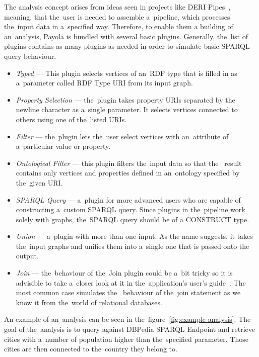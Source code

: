 The analysis concept arises from ideas seen in projects like DERI 
Pipes~\cite{deri-pipes}, meaning, that the~user is needed to assemble a~pipeline,
which processes the~input data in a~specified way. Therefore, to enable them a 
building of an~analysis, Payola is bundled with several basic 
plugins. Generally, the~list of plugins contains as many plugins as needed
in order to simulate basic SPARQL query behaviour.

\begin{itemize}
  \item \emph{Typed} --- This plugin selects vertices of an~RDF type that is filled in
  as a~parameter called RDF Type URI from its input graph.
  
  \item \emph{Property Selection} --- the~plugin takes property URIs separated by the
  newline character as a~single parameter. It selects vertices connected
  to others using one of the~listed URIs.
  
  \item \emph{Filter} --- the~plugin lets the~user select vertices with an~attribute of
  a~particular value or property.
 
  \item \emph{Ontological Filter} --- this plugin filters the~input data so that the~
  result contains only vertices and properties defined in an~ontology specified 
  by the~given URI.
  
  \item \emph{SPARQL Query} --- a~plugin for more advanced users who are capable of 
  constructing a~custom SPARQL query. Since plugins in the~pipeline work solely with 
  graphs, the~SPARQL query should be of a CONSTRUCT type.
  
  \item \emph{Union} --- a~plugin with more than one input. As the name suggests, it takes 
  the~input graphs and unifies them into a~single one that is passed onto the~
  output.
  
  \item \emph{Join} --- the~behaviour of the~Join plugin could be a~bit tricky so it is advisible
  to take a~closer look at it in the~application's 
  user's guide~\cite{payola:ug:join-plugin}. The most common case simulates the~
  behaviour of the~join statement as we know it from the~world of relational 
  databases.
  
\end{itemize}

An example of an~analysis can be seen in the~figure~\ref{fig:example-analysis}.
The goal of the~analysis is to query against DBPedia SPARQL Endpoint and 
retrieve cities with a~number of population higher than the~specified parameter. 
Those cities are then connected to the~country they belong to.

